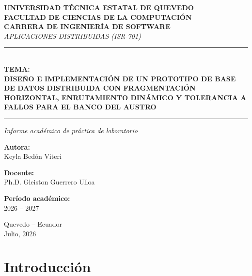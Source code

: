 \documentclass[11pt,a4paper]{article}
\begin{document}
\begin{titlepage}
\begin{center}

{\Large\bfseries\color{primario} UNIVERSIDAD TÉCNICA ESTATAL DE QUEVEDO}\\[6pt]
{\large\bfseries\color{acento} FACULTAD DE CIENCIAS DE LA COMPUTACIÓN}\\[4pt]
{\large\bfseries\color{gris} CARRERA DE INGENIERÍA DE SOFTWARE}\\[18pt]
{\normalsize\itshape APLICACIONES DISTRIBUIDAS (ISR-701)}

\vspace{2.5cm}
{\color{primario}\rule{\linewidth}{1pt}}\\[14pt]

{\normalsize\bfseries\color{gris} TEMA:}\\[8pt]
{\Large\bfseries\color{primario}
DISEÑO E IMPLEMENTACIÓN DE UN PROTOTIPO DE BASE DE DATOS DISTRIBUIDA CON FRAGMENTACIÓN HORIZONTAL, ENRUTAMIENTO DINÁMICO Y TOLERANCIA A FALLOS PARA EL BANCO DEL AUSTRO
}\\[12pt]
{\color{primario}\rule{\linewidth}{1pt}}

\vspace{2cm}
{\normalsize\itshape Informe académico de práctica de laboratorio}

\vspace{2cm}
{\normalsize\bfseries Autora:}\\[4pt]
{\large Keyla Bedón Viteri}

\vspace{1cm}
{\normalsize\bfseries Docente:}\\[4pt]
{\large Ph.D. Gleiston Guerrero Ulloa}

\vspace{1cm}
{\normalsize\bfseries Período académico:}\\[4pt]
{\large 2026 -- 2027}

\vspace{2cm}
{\normalsize Quevedo -- Ecuador}\\
{\normalsize Julio, 2026}

\end{center}
\end{titlepage}

\newpage

\section{Introducción}
\end{document}
